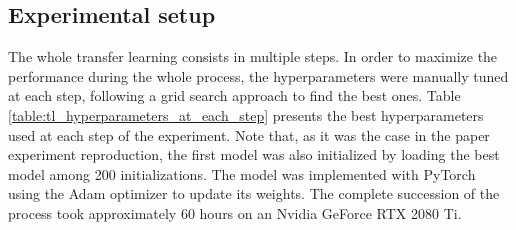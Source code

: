 \subsection{Experimental setup}
\setlength{\marginparwidth}{3cm}\leavevmode {}The whole transfer learning consists in multiple steps. In order to maximize the performance during the whole process, the hyperparameters were manually tuned at each step, following a grid search approach to find the best ones. Table \ref{table:tl_hyperparameters_at_each_step} presents the best hyperparameters used at each step of the experiment. Note that, as it was the case in the paper experiment reproduction, the first model was also initialized by loading the best model among 200 initializations. The model was implemented with PyTorch using the Adam optimizer to update its weights. The complete succession of the process took approximately 60 hours on an Nvidia GeForce RTX 2080 Ti. 

